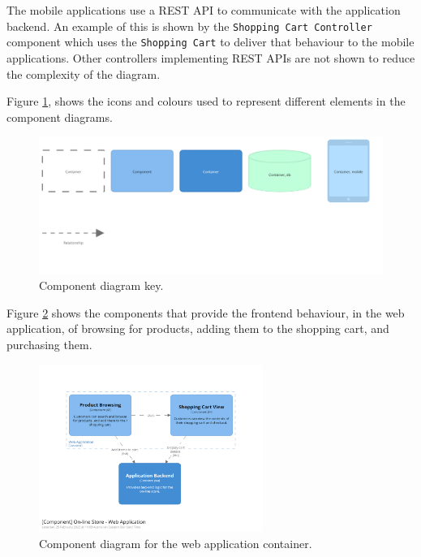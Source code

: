The mobile applications use a REST API to communicate with the application backend.
An example of this is shown by the \texttt{Shopping Cart Controller} component
which uses the \texttt{Shopping Cart} to deliver that behaviour to the mobile applications.
Other controllers implementing REST APIs are not shown to reduce the complexity of the diagram.

Figure \ref{fig:c4_component_key}, shows the icons and colours used to represent different elements in the component diagrams. \\

\begin{figure}[h!]
    \centering
    \begin{adjustwidth}{-7.5mm}{-7.5mm}
        \includegraphics[trim=15 510 90 20,clip,width=0.95\paperwidth]{images/c4/component_diagram-key.png}
    \end{adjustwidth}
    \caption{Component diagram key.}
    \label{fig:c4_component_key}
\end{figure}

\noindent
Figure \ref{fig:c4_component_webapp} shows the components that provide the frontend behaviour,
in the web application,
of browsing for products, adding them to the shopping cart, and purchasing them.

\begin{figure}[h!]
    \centering
    \includegraphics[trim=190 193 190 195,clip,width=0.65\textwidth]{images/c4/webapp_component_diagram.png}
    \caption{Component diagram for the web application container.}
    \label{fig:c4_component_webapp}
\end{figure}

